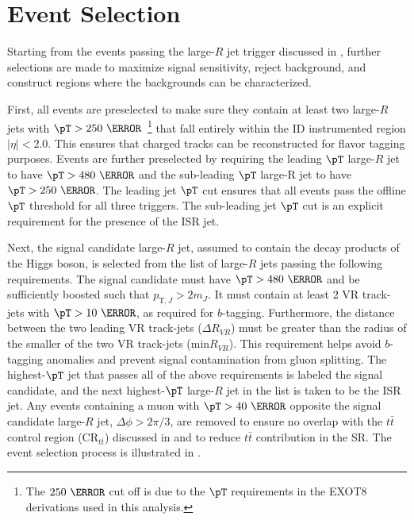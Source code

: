 \section{Event Selection} \label{sec:selection:event_selection}

Starting from the events passing the large-$R$ jet trigger discussed in
, further selections are made to maximize signal
sensitivity, reject background, and construct regions where the backgrounds
can be characterized.  

First, all events are preselected to make sure they contain at least two
large-$R$ jets with $\pT > 250~\GeV$~\footnote{The $250~\GeV$ cut off is due to
the $\pT$ requirements in the EXOT8 derivations used in this analysis.} that
fall entirely within the ID instrumented region $|\eta| < 2.0$. This ensures
that charged tracks can be reconstructed for flavor tagging purposes.  Events
are further preselected by requiring the leading $\pT$ large-$R$ jet to have
$\pT > 480~\GeV$ and the sub-leading $\pT$ large-R jet to have $\pT >
250~\GeV$. The leading jet $\pT$ cut ensures that all events pass the offline
$\pT$ threshold for all three triggers.  The sub-leading jet $\pT$ cut is an
explicit requirement for the presence of the ISR jet. 

Next, the signal candidate large-$R$ jet, assumed to contain the decay products
of the Higgs boson, is selected from the list of large-$R$ jets passing the
following requirements.  The signal candidate must have $\pT > 480~\GeV$ and be
sufficiently boosted such that $p_{\text{T},J} > 2m_{J}$.  It must contain at
least 2 VR track-jets with $\pT > 10~\GeV$, as required for $b$-tagging.
Furthermore, the distance between the two leading VR track-jets ($\Delta
R_{VR}$) must be greater than the radius of the smaller of the two VR
track-jets (min$R_{VR}$).  This requirement helps avoid $b$-tagging anomalies
and prevent signal contamination from gluon splitting.  The highest-$\pT$ jet
that passes all of the above requirements is labeled the signal candidate, and
the next highest-$\pT$ large-$R$ jet in the list is taken to be the ISR jet.
Any events containing a muon with $\pT > 40~\GeV$ opposite the signal candidate
large-$R$ jet, $\Delta \phi > 2\pi/3$, are removed to ensure no overlap with
the $t\bar{t}$ control region ($\text{CR}_{t\bar{t}}$) discussed in
 and to reduce $t\bar{t}$ contribution in the SR.
The event selection process is illustrated in .

